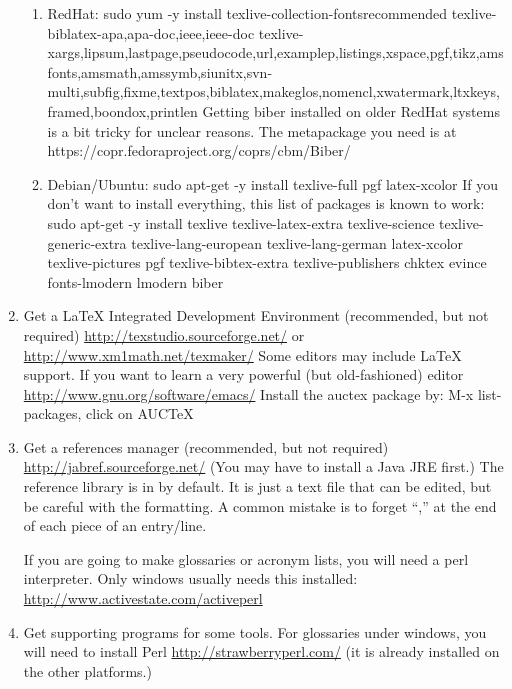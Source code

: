 \begin{enumerate}
   \begin{enumerate}
   \item RedHat: sudo yum -y install
     texlive-collection-fontsrecommended
     texlive-biblatex-{apa,apa-doc,ieee,ieee-doc}
     texlive-{xargs,lipsum,lastpage,pseudocode,url,examplep,listings,xspace,pgf,tikz,amsfonts,amsmath,amssymb,siunitx,svn-multi,subfig,fixme,textpos,biblatex,makeglos,nomencl,xwatermark,ltxkeys,framed,boondox,printlen}
     Getting biber installed on older RedHat systems is a bit tricky
     for unclear reasons.  The metapackage you need is at
     https://copr.fedoraproject.org/coprs/cbm/Biber/ 
   \item Debian/Ubuntu:
     sudo apt-get -y install texlive-full pgf latex-xcolor
     If you don't want to install everything, this list of packages is known
     to work: sudo apt-get -y install texlive texlive-latex-extra
     texlive-science texlive-generic-extra texlive-lang-european
     texlive-lang-german latex-xcolor texlive-pictures pgf
     texlive-bibtex-extra texlive-publishers chktex evince
     fonts-lmodern lmodern biber
   \end{enumerate}
 \item Get a LaTeX Integrated Development Environment (recommended, but not required)
   \url{http://texstudio.sourceforge.net/} or
   \url{http://www.xm1math.net/texmaker/}
   Some editors may include LaTeX support.
   If you want to learn a very powerful (but old-fashioned) editor \url{http://www.gnu.org/software/emacs/}
      Install the auctex package by: M-x list-packages, click on AUCTeX

    \item Get a references manager (recommended, but not required)\label{list:refmanager}
   \url{http://jabref.sourceforge.net/}  (You may have to install a Java JRE first.)
   The reference library is in  by default.
   It is just a text file that can be edited, but be careful with the formatting.
   A common mistake is to forget ``,'' at the end of each piece of an entry/line.

   If you are going to make glossaries or acronym lists, you will need
   a perl interpreter.  Only windows usually needs this installed:
   \url{http://www.activestate.com/activeperl}

 \item Get supporting programs for some tools.
   For glossaries under windows, you will need to install Perl
   \url{http://strawberryperl.com/}
   (it is already installed on the other platforms.)
   

\end{enumerate}
